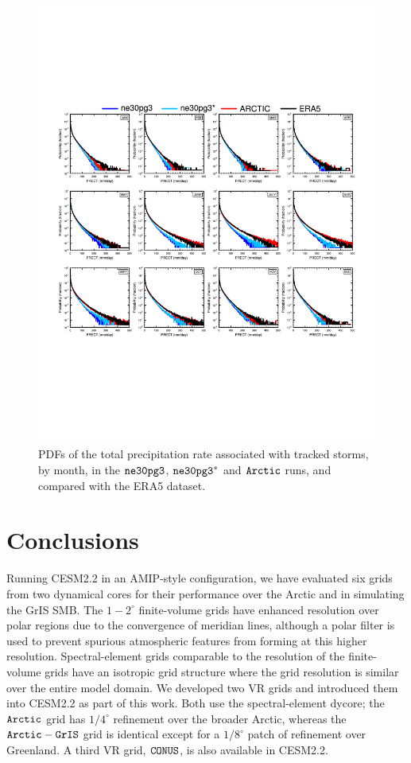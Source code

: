 \documentclass[draft]{agujournal2019}
\begin{document}
\begin{figure}[t]
\begin{center}
         \includegraphics[width=130mm]{figs/temp_composite_ge45N_pdf.pdf}
\end{center}
\caption{PDFs of the total precipitation rate associated with tracked storms, by month, in the $\tt ne30pg3$, $\tt ne30pg3^{*}$ and $\tt Arctic$ runs, and compared with the ERA5 dataset.}
\label{fig:comp-pdf}
\end{figure}

\section{Conclusions}\label{sec:conclusions}

Running CESM2.2 in an AMIP-style configuration, we have evaluated six grids from two dynamical cores for their performance over the Arctic and in simulating the GrIS SMB. The $1-2^{\circ}$ finite-volume grids have enhanced resolution over polar regions due to the convergence of meridian lines, although a polar filter is used to prevent spurious atmospheric features from forming at this higher resolution. Spectral-element grids comparable to the resolution of the finite-volume grids have an isotropic grid structure where the grid resolution is similar over the entire model domain.
We developed two VR grids and introduced them into CESM2.2 as part of this work. Both use the spectral-element dycore; the $\tt Arctic$ grid has $1/4^{\circ}$ refinement over the broader Arctic, whereas the $\tt Arctic-GrIS$ grid is identical except for a $1/8^{\circ}$ patch of refinement over Greenland. A third VR grid, $\tt CONUS$, is also available in CESM2.2.
\end{document}
